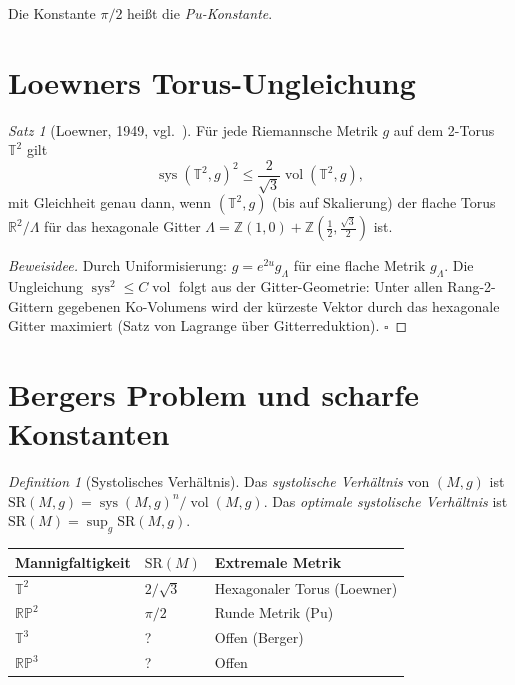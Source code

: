 \documentclass[12pt,a4paper]{amsart}
\theoremstyle{definition}
\theoremstyle{remark}
\newtheorem{satz}[theorem]{Satz}
\newtheorem{definition_de}[theorem]{Definition}
\DeclareMathOperator{\sys}{sys}
\DeclareMathOperator{\vol}{vol}
\newcommand{\RR}{\mathbb{R}}
\newcommand{\ZZ}{\mathbb{Z}}
\newcommand{\RP}{\mathbb{RP}}
\newcommand{\TT}{\mathbb{T}}
\begin{document}
Die Konstante $\pi/2$ heißt die \emph{Pu-Konstante}.

\section{Loewners Torus-Ungleichung}

\begin{satz}[Loewner, 1949, vgl.\ \cite{Pu1952}]
Für jede Riemannsche Metrik $g$ auf dem 2-Torus $\TT^2$ gilt
\[
  \sys(\TT^2, g)^2 \le \frac{2}{\sqrt{3}} \vol(\TT^2, g),
\]
mit Gleichheit genau dann, wenn $(\TT^2, g)$ (bis auf Skalierung) der flache
Torus $\RR^2/\Lambda$ für das hexagonale Gitter
$\Lambda = \ZZ(1,0) + \ZZ(\tfrac{1}{2},\tfrac{\sqrt{3}}{2})$ ist.
\end{satz}

\begin{proof}[Beweisidee]
Durch Uniformisierung: $g = e^{2u} g_\Lambda$ für eine flache Metrik $g_\Lambda$.
Die Ungleichung $\sys^2 \le C \vol$ folgt aus der Gitter-Geometrie:
Unter allen Rang-2-Gittern gegebenen Ko-Volumens wird der kürzeste Vektor
durch das hexagonale Gitter maximiert (Satz von Lagrange über
Gitterreduktion). $\square$
\end{proof}

\section{Bergers Problem und scharfe Konstanten}

\begin{definition_de}[Systolisches Verhältnis]
Das \emph{systolische Verhältnis} von $(M,g)$ ist
$\mathrm{SR}(M,g) = \sys(M,g)^n/\vol(M,g)$.
Das \emph{optimale systolische Verhältnis} ist $\mathrm{SR}(M) = \sup_g \mathrm{SR}(M,g)$.
\end{definition_de}

\begin{center}
\begin{tabular}{lll}
\toprule
Mannigfaltigkeit & $\mathrm{SR}(M)$ & Extremale Metrik \\
\midrule
$\TT^2$ & $2/\sqrt{3}$ & Hexagonaler Torus (Loewner) \\
$\RP^2$ & $\pi/2$ & Runde Metrik (Pu) \\
$\TT^3$ & ? & Offen (Berger) \\
$\RP^3$ & ? & Offen \\
\bottomrule
\end{tabular}
\end{center}
\end{document}
